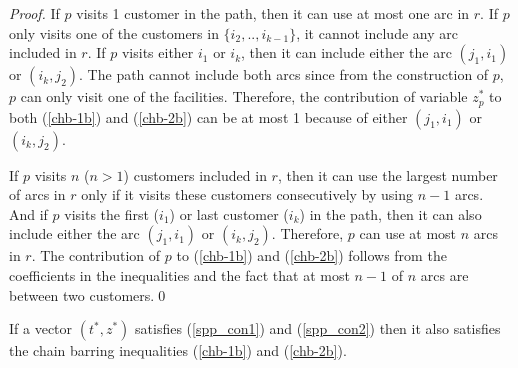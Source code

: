 \begin{proof}
If $p$ visits 1 customer in the path, then it can use at most one
arc in $r$. If $p$ only visits one of the customers in $\{i_2, ..,i_{k-1}\}$,
it cannot include any arc included in $r$. If $p$ visits
either $i_1$ or $i_k$, then it can include either the arc $(j_1,i_1)$ or
$(i_k,j_2)$. The path cannot include both arcs since from the construction
of $p$, $p$ can only visit one of the facilities. Therefore, the contribution of
variable $z^*_p$ to both (\ref{chb-1b}) and (\ref{chb-2b}) can be at most
1 because of either $(j_1,i_1)$ or $(i_k,j_2)$.

If $p$ visits $n$ ($n>1$) customers included in $r$, then it can use the
largest number of arcs in $r$ only if it visits these customers consecutively
by using $n - 1$ arcs. And if $p$ visits the first ($i_1$) or last customer ($i_k$)
in the path, then it can also include either the arc $(j_1,i_1)$ or $(i_k,j_2)$.
Therefore, $p$ can use at most $n$ arcs in $r$. The contribution of
$p$ to  (\ref{chb-1b}) and (\ref{chb-2b}) follows from the coefficients
in the inequalities and the fact that at most $n-1$ of $n$ arcs are between two customers.\qed
\end{proof}
\begin{prop}
If a vector $(t^*,z^*)$ satisfies (\ref{spp_con1}) and (\ref{spp_con2})
then it also
satisfies the chain barring inequalities (\ref{chb-1b}) and (\ref{chb-2b}).
\end{prop}
